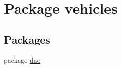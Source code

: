 \hypertarget{namespacevehicles}{}\section{Package vehicles}
\label{namespacevehicles}
\subsection*{Packages}
\begin{DoxyCompactItemize}
\item 
package \mbox{\hyperlink{namespacevehicles_1_1dao}{dao}}
\end{DoxyCompactItemize}
